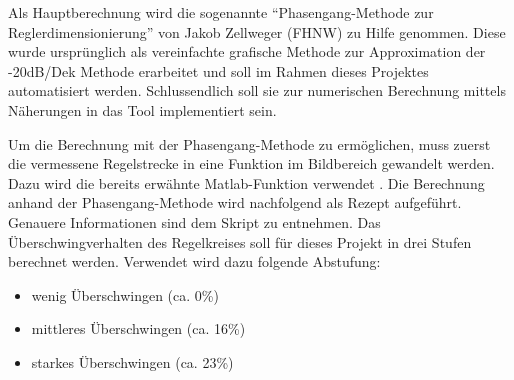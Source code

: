 Als     Hauptberechnung    wird     die    sogenannte     ``Phasengang-Methode
zur      Reglerdimensionierung''      von     Jakob      Zellweger      (FHNW)
\cite{regelungstechnik:zellweger_short}   zu   Hilfe   genommen. Diese   wurde
urspr\"unglich  als  vereinfachte  grafische  Methode  zur  Approximation  der
-20dB/Dek Methode erarbeitet und soll im Rahmen dieses Projektes automatisiert
werden. Schlussendlich   soll   sie   zur   numerischen   Berechnung   mittels
N\"aherungen in das Tool implementiert sein.

Um die  Berechnung mit  der Phasengang-Methode  zu erm\"oglichen,  muss zuerst
die  vermessene  Regelstrecke  in   eine  Funktion  im  Bildbereich  gewandelt
werden. Dazu  wird die  bereits  erw\"ahnte Matlab-Funktion  
verwendet  . Die Berechnung anhand  der Phasengang-Methode
wird  nachfolgend  als  Rezept aufgef\"uhrt. Genauere  Informationen  sind
dem   Skript   \cite{regelungstechnik:zellweger_short}  zu   entnehmen.    Das
\"Uberschwingverhalten  des Regelkreises  soll  f\"ur dieses  Projekt in  drei
Stufen berechnet werden. Verwendet wird dazu folgende Abstufung:


\begin{itemize}
    \item
        wenig \"Uberschwingen (ca. 0\%)
    \item
        mittleres \"Uberschwingen (ca. 16\%)
    \item
        starkes \"Uberschwingen (ca. 23\%)
\end{itemize}

